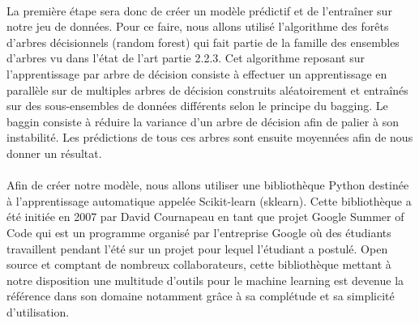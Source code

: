 \paragraph{}La première étape sera donc de créer un modèle prédictif et de l'entraîner sur notre jeu de données. Pour ce faire, nous allons utilisé l'algorithme des forêts d'arbres décisionnels (random forest) qui fait partie de la famille des ensembles d'arbres vu dans l'état de l'art partie 2.2.3. Cet algorithme reposant sur l'apprentissage par arbre de décision consiste à effectuer un apprentissage en parallèle sur de multiples arbres de décision construits aléatoirement et entraînés sur des sous-ensembles de données différents selon le principe du bagging. Le baggin consiste à réduire la variance d'un arbre de décision afin de palier à son instabilité. Les prédictions de tous ces arbres sont ensuite moyennées afin de nous donner un résultat.

\paragraph{}Afin de créer notre modèle, nous allons utiliser une bibliothèque Python destinée à l'apprentissage automatique appelée Scikit-learn (sklearn)\cite{sklearnDepot}. Cette bibliothèque a été initiée en 2007 par David Cournapeau en tant que projet Google Summer of Code qui est un programme organisé par l'entreprise Google où des étudiants travaillent pendant l'été sur un projet pour lequel l'étudiant a postulé. Open source et comptant de nombreux collaborateurs, cette bibliothèque mettant à notre disposition une multitude d'outils pour le machine learning est devenue la référence dans son domaine notamment grâce à sa complétude et sa simplicité d'utilisation.


